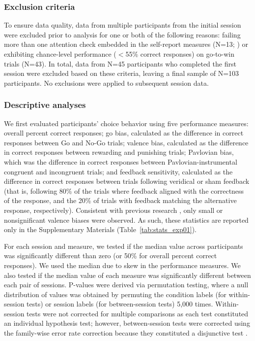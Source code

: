 \documentclass[a4paper,12pt]{article}
\begin{document}
\begin{refsection}[main]
\subsubsection*{Exclusion criteria}

To ensure data quality, data from multiple participants from the initial session were excluded prior to analysis for one or both of the following reasons: failing more than one attention check embedded in the self-report measures (N=13; \cite{zorowitz2023inattentive}) or exhibiting chance-level performance ($<$55\% correct responses) on go-to-win trials (N=43). In total, data from N=45 participants who completed the first session were excluded based on these criteria, leaving a final sample of N=103 participants. No exclusions were applied to subsequent session data. 

\subsubsection*{Descriptive analyses}

We first evaluated participants' choice behavior using five performance measures: overall percent correct responses; go bias, calculated as the difference in correct responses between Go and No-Go trials; valence bias, calculated as the difference in correct responses between rewarding and punishing trials; Pavlovian bias, which was the difference in correct responses between Pavlovian-instrumental congruent and incongruent trials; and feedback sensitivity, calculated as the difference in correct responses between trials following veridical or sham feedback (that is, following 80\% of the trials where feedback aligned with the correctness of the response, and the 20\% of trials with feedback matching the alternative response, respectively). Consistent with previous research \cite{guitart2012go, saeedpour2023interindividual}, only small or nonsignificant valence biases were observed. As such, these statistics are reported only in the Supplementary Materials (Table~\ref{tab:stats_exp01}).

For each session and measure, we tested if the median value across participants was significantly different than zero (or 50\% for overall percent correct responses). We used the median due to skew in the performance measures. We also tested if the median value of each measure was significantly different between each pair of sessions. P-values were derived via permutation testing, where a null distribution of values was obtained by permuting the condition labels (for within-session tests) or session labels (for between-session tests) 5,000 times. Within-session tests were not corrected for multiple comparisons as each test constituted an individual hypothesis test; however, between-session tests were corrected using the family-wise error rate correction \cite{winkler2014permutation} because they constituted a disjunctive test \cite{rubin2021adjust}.


\end{refsection}
\end{document}
